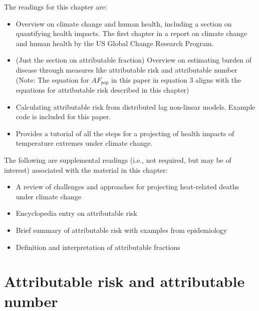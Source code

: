 \documentclass[
]{book}
\providecommand{\tightlist}{%
  \setlength{\itemsep}{0pt}\setlength{\parskip}{0pt}}
\begin{document}
The readings for this chapter are:

\begin{itemize}
\tightlist
\item
  \citet{balbus2016climate} Overview on climate change and human health, including a section on quantifying health impacts. The first chapter in a report on climate change and human health by the US Global Change Research Program.
\item
  \citet{steenland2006overview} (Just the section on attributable fraction) Overview on estimating burden of disease through measures like attributable risk and attributable number (Note: The equation for \(AF_{pop}\) in this paper in equation 3 aligns with the equations for attributable risk described in this chapter)
\item
  \citet{gasparrini2014attributable} Calculating attributable risk from distributed lag non-linear models. Example code is included for this paper.
\item
  \citet{vicedo2019hands} Provides a tutorial of all the steps for a
  projecting of health impacts of temperature extremes under climate change.
\end{itemize}

The following are supplemental readings (i.e., not required, but may be of
interest) associated with the material in this chapter:

\begin{itemize}
\tightlist
\item
  \citet{kinney2008approaches} A review of challenges and approaches for projecting heat-related deaths under climate change
\item
  \citet{benichou2006attributable} Encyclopedia entry on attributable risk
\item
  \citet{northridge1995public} Brief summary of attributable risk with examples from epidemiology
\item
  \citet{greenland1988conceptual} Definition and interpretation of attributable fractions
\end{itemize}

\hypertarget{attributable-risk-and-attributable-number}{%
\section{Attributable risk and attributable number}\label{attributable-risk-and-attributable-number}}
\end{document}
